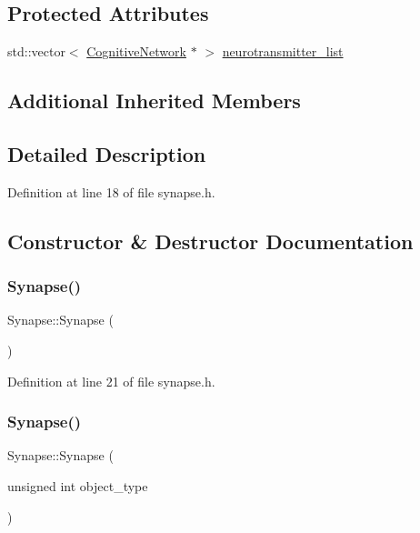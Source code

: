 \subsection*{Protected Attributes}
\begin{DoxyCompactItemize}
\item 
std\+::vector$<$ \mbox{\hyperlink{class_cognitive_network}{Cognitive\+Network}} $\ast$ $>$ \mbox{\hyperlink{class_synapse_ae1ab127b1a94b459f20aa5a5e9a23630}{neurotransmitter\+\_\+list}}
\end{DoxyCompactItemize}
\subsection*{Additional Inherited Members}


\subsection{Detailed Description}


Definition at line 18 of file synapse.\+h.



\subsection{Constructor \& Destructor Documentation}
\mbox{\label{class_synapse_a68e6c8546084f93ae7d39af6986562fb}} 
\subsubsection{\texorpdfstring{Synapse()}{Synapse()}\hspace{0.1cm}{\footnotesize\ttfamily [1/4]}}
{\footnotesize\ttfamily Synapse\+::\+Synapse (\begin{DoxyParamCaption}{ }\end{DoxyParamCaption})\hspace{0.3cm}{\ttfamily [inline]}}



Definition at line 21 of file synapse.\+h.

\mbox{\label{class_synapse_a821e35d693de963edb6d5aa9e565dfde}} 
\subsubsection{\texorpdfstring{Synapse()}{Synapse()}\hspace{0.1cm}{\footnotesize\ttfamily [2/4]}}
{\footnotesize\ttfamily Synapse\+::\+Synapse (\begin{DoxyParamCaption}\item[{unsigned int}]{object\+\_\+type }\end{DoxyParamCaption})\hspace{0.3cm}{\ttfamily [inline]}}



